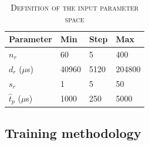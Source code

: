 

\begin{table}[t]
\centering
\renewcommand{\arraystretch}{1.2}
\caption{\textsc{Definition of the input parameter space}\label{tab:sumo parameters}}
\begin{tabular}{llll}
\hline
\textbf{Parameter}       & \textbf{Min}  & \textbf{Step}   & \textbf{Max}  \\
\hline
$n_r$        & 60 & 5 & 400  \\
$d_r$ ($\mu$s)          & 40960 & 5120 & 204800    \\
$s_r$           & 1 & 5 & 50    \\
$\hat{t}_p$ ($\mu$s)           & 1000 & 250 & 5000    \\
\hline
\end{tabular}
\end{table}


 





\subsection{Training methodology \label{subs:raw_training}}


